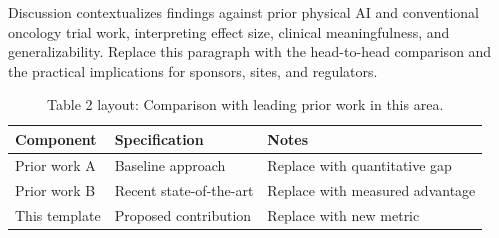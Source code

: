 
Discussion contextualizes findings against prior physical AI and conventional oncology trial work, interpreting effect size, clinical meaningfulness, and generalizability. Replace this paragraph with the head-to-head comparison and the practical implications for sponsors, sites, and regulators.

\begin{table}[H]
\caption{Table 2 layout: Comparison with leading prior work in this area.}
\label{tab:discussion_compare}
\centering
\begin{tabular}{>{\raggedright\arraybackslash}p{3.4cm} >{\raggedright\arraybackslash}p{4.6cm} >{\raggedright\arraybackslash}p{5.4cm}}
\toprule
\textbf{Component} & \textbf{Specification} & \textbf{Notes} \\
\midrule
  Prior work A & Baseline approach & Replace with quantitative gap \\
  Prior work B & Recent state-of-the-art & Replace with measured advantage \\
  This template & Proposed contribution & Replace with new metric \\
\bottomrule
\end{tabular}
\end{table}

